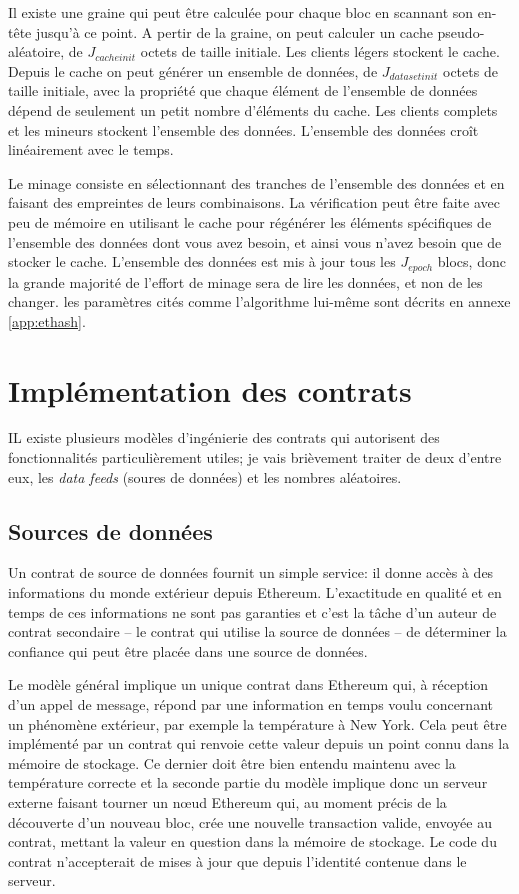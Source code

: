 \documentclass[9pt,oneside]{amsart}
\begin{document}
\begin{multicols}{2}
Il existe une graine qui peut être calculée pour chaque bloc en scannant son en-tête jusqu'à ce point. A pertir de la graine, on peut calculer un cache pseudo-aléatoire, de $J_{cacheinit}$ octets de taille initiale. Les clients légers stockent le cache. Depuis le cache on peut générer un ensemble de données, de $J_{datasetinit}$ octets de taille initiale, avec la propriété que chaque élément de l'ensemble de données dépend de seulement un petit nombre d'éléments du cache. Les clients complets et les mineurs stockent l'ensemble des données. L'ensemble des données croît linéairement avec le temps. 


Le minage consiste en sélectionnant des tranches de l'ensemble des données et en faisant des empreintes de leurs combinaisons. La vérification peut être faite avec peu de mémoire en utilisant le cache pour régénérer les éléments spécifiques de l'ensemble des données dont vous avez besoin, et ainsi vous n'avez besoin que de stocker le cache. L'ensemble des données est mis à jour tous les $J_{epoch}$ blocs, donc la grande majorité de l'effort de minage sera de lire les données, et non de les changer. les paramètres cités comme l'algorithme lui-même sont décrits en annexe \ref{app:ethash}.

\section{Implémentation des contrats}

IL existe plusieurs modèles d'ingénierie des contrats qui autorisent des fonctionnalités particulièrement utiles; je vais brièvement traiter de deux d'entre eux, les \textit{data feeds} (soures de données) et les nombres aléatoires.

\subsection{Sources de données}
Un contrat de source de données fournit un simple service: il donne accès à des informations du monde extérieur depuis Ethereum. L'exactitude en qualité et en temps de ces informations ne sont pas garanties et c'est la tâche d'un auteur de contrat secondaire -- le contrat qui utilise la source de données -- de déterminer la confiance qui peut être placée dans une source de données. 

Le modèle général implique un unique contrat dans Ethereum qui, à réception d'un appel de message, répond par une information en temps voulu concernant un phénomène extérieur, par exemple la température à New York. Cela peut être implémenté par un contrat qui renvoie cette valeur depuis un point connu dans la mémoire de stockage. Ce dernier doit être bien entendu maintenu avec la température correcte et la seconde partie du modèle implique donc un serveur externe faisant tourner un n\oe{}ud Ethereum qui, au moment précis de la découverte d'un nouveau bloc, crée une nouvelle transaction valide, envoyée au contrat, mettant la valeur en question dans la mémoire de stockage. Le code du contrat n'accepterait de mises à jour que depuis l'identité contenue dans le serveur.


\end{multicols}
\end{document}
